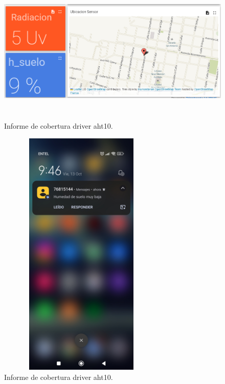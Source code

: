 \begin{figure}[h!]
  \centering
    \includegraphics[width=\linewidth, height=7cm]{./Figures/humedad_menor2.png}
  \caption{Informe de cobertura driver aht10.}
    \label{fig:humedad menor}
\end{figure}

\begin{figure}[h!]
  \centering
    \includegraphics[width=8cm, height=12cm]{./Figures/sms_alarma.jpg}
  \caption{Informe de cobertura driver aht10.}
    \label{fig:sms alarma}
\end{figure}

\label{sec:pruebasHW}

